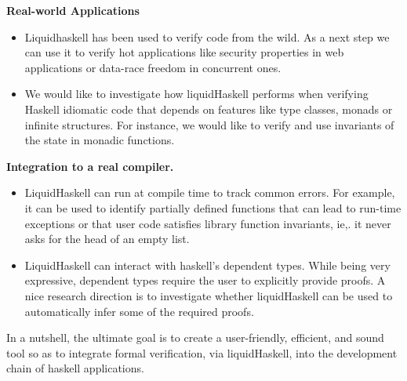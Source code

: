 \textbf{Real-world Applications}
\begin{itemize}

\item Liquidhaskell has been used to verify code from the wild.
As a next step we can use it to verify hot applications
like security properties in web applications
or data-race freedom in concurrent ones.

\item 
  We would like to investigate how liquidHaskell performs when verifying Haskell idiomatic 
  code that depends on features like type classes, monads or infinite structures.
  For instance, we would like to verify and use invariants of the state 
  in monadic functions.
\end{itemize}

\textbf{Integration to a real compiler.}
\begin{itemize}
\item LiquidHaskell can run at compile time to track common 
 errors. 
For example, it can be used to identify partially defined functions 
 that can lead to run-time exceptions or 
 that user code satisfies library function invariants, ie,.
 it never asks for the head of an empty list.
 
\item LiquidHaskell can interact with haskell's dependent types.
  While being very expressive, dependent types require the user to 
  explicitly provide proofs.
  A nice research direction is to investigate 
  whether liquidHaskell can be used to automatically infer
  some of the required proofs.
  \end{itemize}

In a nutshell, the ultimate goal is to create a 
user-friendly, efficient, and sound tool 
so as to integrate formal verification, via liquidHaskell, 
into the development chain of haskell applications.

